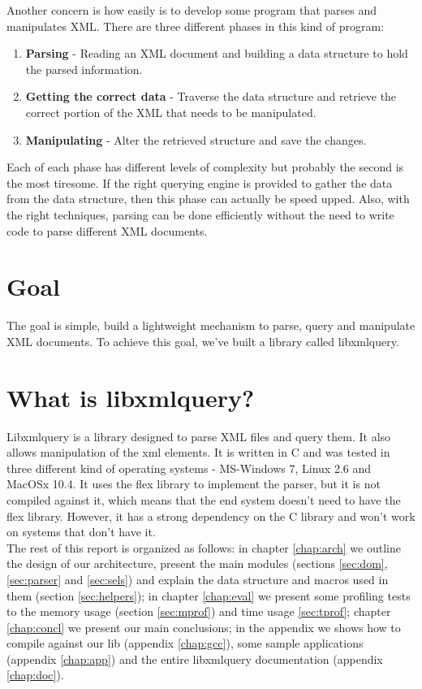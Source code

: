\documentclass[a4paper]{report}
\begin{document}
	Another concern is how easily is to develop some program that parses and manipulates XML. There are three different phases in this kind of program:

	\begin{enumerate}
		\item \textbf{Parsing} - Reading an XML document and building a data structure to hold the parsed information.
		\item \textbf{Getting the correct data} - Traverse the data structure and retrieve the correct portion of the XML that needs to be manipulated.
		\item \textbf{Manipulating} - Alter the retrieved structure and save the changes.
	\end{enumerate}

	Each of each phase has different levels of complexity but probably the second is the most tiresome. If the right querying engine is provided to gather the data from the data structure, then this phase can actually be
	speed upped. Also, with the right techniques, parsing can be done efficiently without the need to write code to parse different XML documents.

\section{Goal}
	The goal is simple, build a lightweight mechanism to parse, query and manipulate XML documents. To achieve this goal, we've built a library called libxmlquery.

\section{What is libxmlquery?}
	Libxmlquery is a library designed to parse XML files and query them. It also allows manipulation of the xml elements. It is written in C and was tested in three different kind of operating systems - MS-Windows 7, Linux 2.6
	and MacOSx 10.4. It uses the flex library to implement the parser, but it is not compiled against it, which means that the end system doesn't need to have the flex library. However, it has a strong dependency on the C library
	and won't work on systems that don't have it.\\


	The rest of this report is organized as follows: in chapter \ref{chap:arch} we outline the design of our architecture, present the main modules (sections \ref{sec:dom}, \ref{sec:parser} and \ref{sec:sels}) and explain the data
	structure and macros used in them (section \ref{sec:helpers}); in chapter \ref{chap:eval} we present some profiling tests to the memory usage (section \ref{sec:mprof}) and time usage \ref{sec:tprof}; chapter
	\ref{chap:concl} we present our main conclusions; in the appendix we shows how to compile against our lib (appendix \ref{chap:gcc}), some sample applications (appendix \ref{chap:app}) and the entire libxmlquery
	documentation (appendix \ref{chap:doc}).
\end{document}
